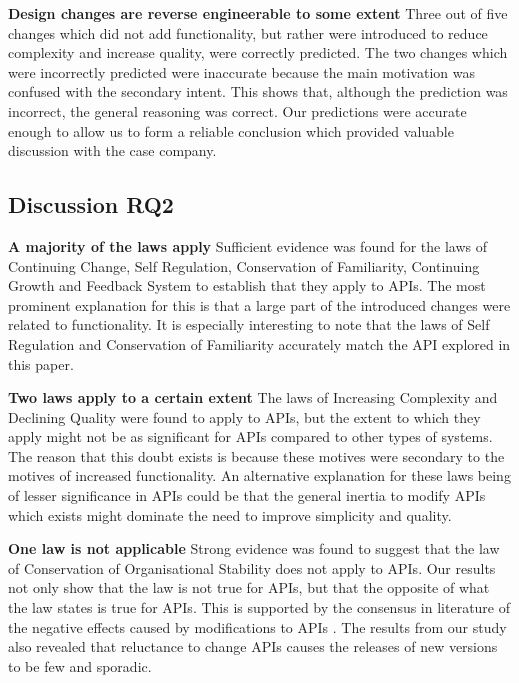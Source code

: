 \documentclass{sig-alternate}
\begin{document}
\smallskip \noindent
\textbf{Design changes are reverse engineerable to some extent  }  %
Three out of five changes which did not add functionality, but rather were introduced to reduce complexity and increase quality, were correctly predicted. The two changes which were incorrectly predicted were inaccurate because the main motivation was confused with the secondary intent. This shows that, although the prediction was incorrect, the general reasoning was correct. Our predictions were accurate enough to allow us to form a reliable conclusion which provided valuable discussion with the case company. 


\subsection{Discussion RQ2}

\noindent
\textbf{A majority of the laws apply  } %
Sufficient evidence was found for the laws of Continuing Change, Self Regulation, Conservation of Familiarity, Continuing Growth and Feedback System to establish that they apply to APIs. The most prominent explanation for this is that a large part of the introduced changes were related to functionality. It is especially interesting to note that the laws of Self Regulation and Conservation of Familiarity accurately match the API explored in this paper. 

\smallskip \noindent
\textbf{Two laws apply to a certain extent  } %
The laws of Increasing Complexity and Declining Quality were found to apply to APIs, but the extent to which they apply might not be as significant for APIs compared to other types of systems. The reason that this doubt exists is because these motives were secondary to the motives of increased functionality. An alternative explanation for these laws being of lesser significance in APIs could be that the general inertia to modify APIs which exists \cite{google_talk} \cite{henning2007api} \cite{mcdonnell2013empirical} \cite{robbes2012developers} might dominate the need to improve simplicity and quality. 

\smallskip \noindent
\textbf{One law is not applicable  } %
Strong evidence was found to suggest that the law of Conservation of Organisational Stability does not apply to APIs. Our results not only show that the law is not true for APIs, but that the opposite of what the law states is true for APIs. This is supported by the consensus in literature of the negative effects caused by modifications to APIs \cite{google_talk} \cite{henning2007api} \cite{mcdonnell2013empirical} \cite{robbes2012developers}. The results from our study also revealed that reluctance to change APIs causes the releases of new versions to be few and sporadic. 
\end{document}
